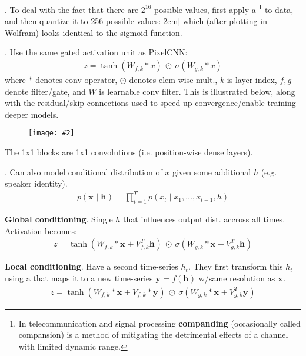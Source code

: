 \documentclass[11pt]{article}
\renewcommand\vec[2][]{\bm{#2}_{#1}}
\newcommand\myfig[2][0.3\textwidth]{\begin{figure}[h!]\centering\texttt{[image: \#2]}\end{figure}}
\newcommand\myspace[1][]{\vspace{#1\bigskipamount}}
\newcommand\p{\Needspace{10\baselineskip} \noindent}
\newcommand\bluesec[1]{\myspace \p \blue{#1}}
\begin{document}
\myspace
\p {}. To deal with the fact that there are $2^{16}$ possible values, first apply a \footnote{In telecommunication and signal processing \textbf{companding} (occasionally called compansion) is a method of mitigating the detrimental effects of a channel with limited dynamic range.} to data, and then quantize it to 256 possible values:[2em]
which (after plotting in Wolfram) looks identical to the sigmoid function.

\myspace
\p {}. Use the same gated activation unit as PixelCNN:
\begin{align}
z = \tanh\left( W_{f,k} * x \right) ~ \odot ~ \sigma\left( W_{g,k} * x \right)
\end{align}
where $*$ denotes conv operator, $\odot$ denotes elem-wise mult., $k$ is layer index, $f,g$ denote filter/gate, and $W$ is learnable conv filter. This is illustrated below, along with the residual/skip connections used to speed up convergence/enable training deeper models.

\myfig[0.6\textwidth]{WaveNetRes.PNG}

The 1x1 blocks are 1x1 convolutions (i.e. position-wise dense layers). 

\bluesec{Conditional Wavenets}. Can also model conditional distribution of $x$ given some additional $h$ (e.g. speaker identity).
\begin{align}
p(\vec x \mid \vec h) = \prod_{t = 1}^{T} p(x_t \mid x_1, \ldots, x_{t - 1}, h)
\end{align}
\begin{compactitem}[$\rightarrow$]
	\item \textbf{Global conditioning}. Single $h$ that influences output dist. accross all times. Activation becomes:
	\begin{align}
	z = \tanh\left( W_{f,k} * \vec x +  V_{f,k}^T \vec h\right) 
		~ \odot ~ 
		\sigma\left( W_{g,k} * \vec x + V_{g,k}^T \vec h\right)
	\end{align}
	
	\item \textbf{Local conditioning}. Have a second time-series $h_t$. They first transform this $h_t$ using a  that maps it to a new time-series $\vec y = f(\vec h)$ w/same resolution as $\vec x$. 
		\begin{align}
	z = \tanh\left( W_{f,k} * \vec x +  V_{f,k} * \vec y \right) 
	~ \odot ~ 
	\sigma\left( W_{g,k} * \vec x + V_{g,k}^T \vec y\right)
	\end{align}
	
	
\end{compactitem}
\end{document}
